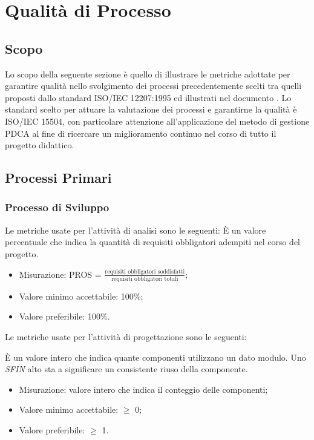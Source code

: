 \section{Qualità di Processo}

\subsection{Scopo}
Lo scopo della seguente sezione è quello di illustrare le metriche adottate per garantire qualità nello svolgimento dei processi precedentemente scelti tra quelli proposti dallo standard ISO/IEC 12207:1995 ed illustrati nel documento \textit{\NdP}. Lo standard scelto per attuare la valutazione dei processi e garantirne la qualità è ISO/IEC 15504, con particolare attenzione all'applicazione del metodo di gestione PDCA al fine di ricercare un miglioramento continuo nel corso di tutto il progetto didattico.

\subsection{Processi Primari}

	\subsubsection{Processo di Sviluppo}
	
		Le metriche usate per l'attività di analisi sono le seguenti:
			È un valore percentuale che indica la quantità di requisiti obbligatori adempiti nel corso del progetto.
			 \begin{itemize}
			\item{Misurazione: PROS = $\displaystyle\frac{\mbox{requisiti obbligatori soddisfatti}}{\mbox{requisiti obbligatori totali}}$;}
			\item{Valore minimo accettabile: 100\%;}
			\item{Valore preferibile: 100\%.}
		\end{itemize}

		Le metriche usate per l'attività di progettazione sono le seguenti:
		
			È un valore intero che indica quante componenti utilizzano un dato modulo. Uno \textit{SFIN} alto sta a significare un consistente riuso della componente.
		\begin{itemize}
			\item{Misurazione: valore intero che indica il conteggio delle componenti;}
			\item{Valore minimo accettabile: $\geq$ 0;}
			\item{Valore preferibile: $\geq$ 1.}
		\end{itemize}
	
